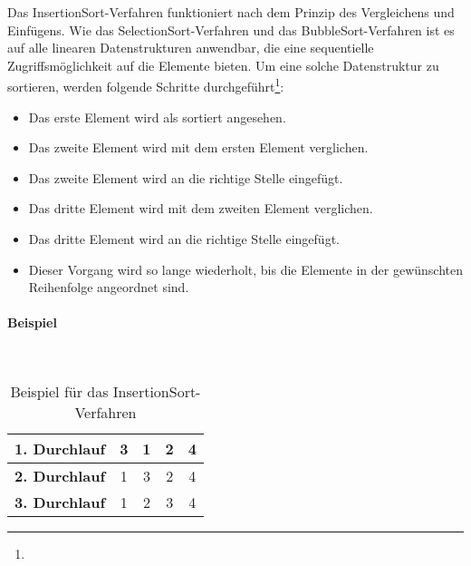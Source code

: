 \documentclass[./entry.tex]{subfiles}
\begin{document}
    Das \dq InsertionSort\dq-Verfahren funktioniert nach dem Prinzip des \dq Vergleichens und Einfügens\dq.
    Wie das \dq SelectionSort\dq-Verfahren und das \dq BubbleSort\dq-Verfahren ist es auf alle linearen Datenstrukturen anwendbar,
    die eine sequentielle Zugriffsmöglichkeit auf die Elemente bieten.
    Um eine solche Datenstruktur zu sortieren, werden folgende Schritte durchgeführt\footnote{}:
    \begin{itemize}
        \item Das erste Element wird als sortiert angesehen.
        \item Das zweite Element wird mit dem ersten Element verglichen.
        \item Das zweite Element wird an die richtige Stelle eingefügt.
        \item Das dritte Element wird mit dem zweiten Element verglichen.
        \item Das dritte Element wird an die richtige Stelle eingefügt.
        \item Dieser Vorgang wird so lange wiederholt, bis die Elemente in der gewünschten Reihenfolge angeordnet sind.
    \end{itemize}

    \paragraph{Beispiel} \mbox{}\\

    \begin{table}[h]
        \centering
        \begin{tabular}{|c|c|c|c|c|}
            \hline
            \textbf{1. Durchlauf} & 3 & {\color{red}1} & 2 & 4 \\
            \hline
            \textbf{2. Durchlauf} & 1 & 3 & {\color{red}2} & 4 \\
            \hline
            \textbf{3. Durchlauf} & 1 & 2 & 3 & 4 \\
            \hline
        \end{tabular}
        \caption{Beispiel für das \dq InsertionSort\dq-Verfahren}
        \label{tab:insertionsort}
    \end{table}
\end{document}
